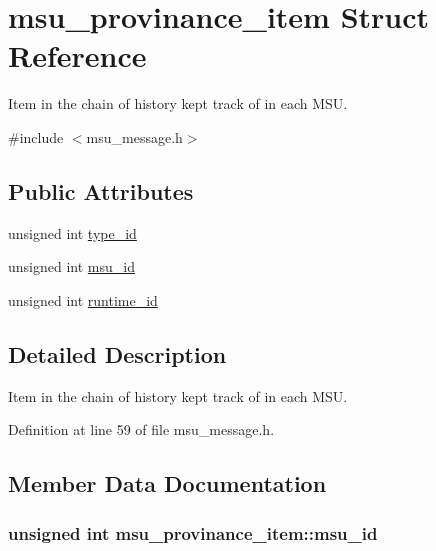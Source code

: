 \hypertarget{structmsu__provinance__item}{\section{msu\-\_\-provinance\-\_\-item Struct Reference}
\label{structmsu__provinance__item}
}


Item in the chain of history kept track of in each M\-S\-U.  




{\ttfamily \#include $<$msu\-\_\-message.\-h$>$}

\subsection*{Public Attributes}
\begin{DoxyCompactItemize}
\item 
unsigned int \hyperlink{structmsu__provinance__item_a87a273f0d05488e4421a712399b17b8d}{type\-\_\-id}
\item 
unsigned int \hyperlink{structmsu__provinance__item_a415436a43ba850f618873cb9c3e3a18b}{msu\-\_\-id}
\item 
unsigned int \hyperlink{structmsu__provinance__item_a03aec79bc90a021ad1d4ef1d2c3296e3}{runtime\-\_\-id}
\end{DoxyCompactItemize}


\subsection{Detailed Description}
Item in the chain of history kept track of in each M\-S\-U. 

Definition at line 59 of file msu\-\_\-message.\-h.



\subsection{Member Data Documentation}
\hypertarget{structmsu__provinance__item_a415436a43ba850f618873cb9c3e3a18b}{
\subsubsection[{msu\-\_\-id}]{\setlength{\rightskip}{0pt plus 5cm}unsigned int msu\-\_\-provinance\-\_\-item\-::msu\-\_\-id}}\label{structmsu__provinance__item_a415436a43ba850f618873cb9c3e3a18b}


